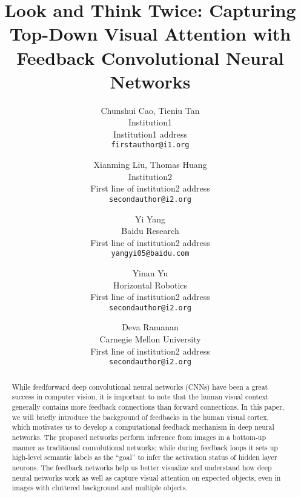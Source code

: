 \documentclass[10pt,twocolumn,letterpaper]{article}
\begin{document}
\title{Look and Think Twice: Capturing Top-Down Visual Attention with Feedback Convolutional Neural Networks}

\author{Chunshui Cao, Tieniu Tan\\
Institution1\\
Institution1 address\\
{\tt\small firstauthor@i1.org}
\and
Xianming Liu, Thomas Huang\\
Institution2\\
First line of institution2 address\\
{\tt\small secondauthor@i2.org}
\and
Yi Yang\\
Baidu Research\\
First line of institution2 address\\
{\tt\small yangyi05@baidu.com}
\and
Yinan Yu\\
Horizontal Robotics\\
First line of institution2 address\\
{\tt\small secondauthor@i2.org}
\and
Deva Ramanan\\
Carnegie Mellon University\\
First line of institution2 address\\
{\tt\small secondauthor@i2.org}
}

\maketitle


\begin{abstract}
While feedforward deep convolutional neural networks (CNNs) have been a great success in computer vision, it is important to note that the human visual context generally contains more feedback connections than forward connections. In this paper, we will briefly introduce the background of feedbacks in the human visual cortex, which motivates us to develop a computational feedback mechanism in deep neural networks. The proposed networks perform inference from images in a bottom-up manner as traditional convolutional networks; while during feedback loops it sets up high-level semantic labels as the “goal” to infer the activation status of hidden layer neurons. The feedback networks help us better visualize and understand how deep neural networks work as well as capture visual attention on expected objects, even in images with cluttered background and multiple objects.
\end{abstract}







{\small


}
\end{document}
